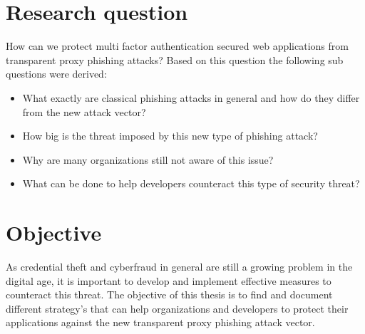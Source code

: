 \documentclass[12pt]{report}
\begin{document}
\section{Research question}
How can we protect multi factor authentication secured web applications from transparent
proxy phishing attacks? Based on this question the following sub questions
were derived:
\begin{itemize}
	\item What exactly are classical phishing attacks in general and how do they
	      differ from the new attack vector?

	\item How big is the threat imposed by this new type of phishing attack?

	\item Why are many organizations still not aware of this issue?

	\item What can be done to help developers counteract this type of security threat?
\end{itemize}

\section{Objective}
As credential theft and cyberfraud in general are still a growing problem in
the digital age, it is important to develop and implement effective measures to
counteract this threat. The objective of this thesis is to find and document
different strategy's that can help organizations and developers to protect their
applications against the new transparent proxy phishing attack vector.
\end{document}
